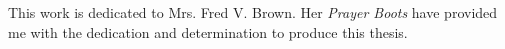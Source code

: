 
This work is dedicated to Mrs$.$ Fred V$.$ Brown.
Her \emph{Prayer Boots} have provided me with the 
dedication and determination to produce this thesis. 
